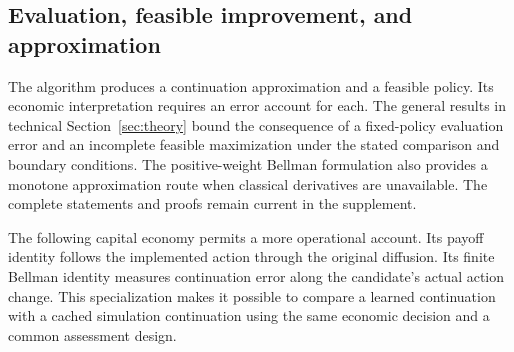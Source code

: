 \subsection{Evaluation, feasible improvement, and approximation}
\label{sec:r16theoryguide}
The algorithm produces a continuation approximation and a feasible policy. Its economic interpretation requires an error account for each. The general results in technical Section~\ref{sec:theory} bound the consequence of a fixed-policy evaluation error and an incomplete feasible maximization under the stated comparison and boundary conditions. The positive-weight Bellman formulation also provides a monotone approximation route when classical derivatives are unavailable. The complete statements and proofs remain current in the supplement.

The following capital economy permits a more operational account. Its payoff identity follows the implemented action through the original diffusion. Its finite Bellman identity measures continuation error along the candidate's actual action change. This specialization makes it possible to compare a learned continuation with a cached simulation continuation using the same economic decision and a common assessment design.
